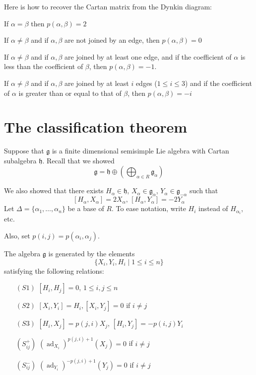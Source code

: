 \documentclass[x11names,reqno,14pt]{extarticle}
\newcommand{\mk}[1]{\mathfrak{#1}}
\newcommand{\g}{\mk{g}}
\newcommand{\h}{\mk{h}}
\DeclareMathOperator{\ad}{ad}
\begin{document}
Here is how to recover the Cartan matrix from the Dynkin diagram: 

If $\alpha = \beta$ then $p(\alpha,\beta)=2$

If $\alpha\neq\beta$ and if $\alpha,\beta$ are not joined by an edge, then $p(\alpha,\beta)=0$

If $\alpha\neq\beta$ and if $\alpha,\beta$ are joined by at least one edge, and if the coefficient of $\alpha$ is less than the coefficient of $\beta$, then $p(\alpha,\beta)=-1$.

If $\alpha\neq\beta$ and if $\alpha,\beta$ are joined by at least $i$ edges ($1\leq i\leq3$) and if the coefficient of $\alpha$ is greater than or equal to that of $\beta$, then $p(\alpha,\beta)=-i$

\section*{The classification theorem}

Suppose that $\g$ is a finite dimensional semisimple Lie algebra with Cartan subalgebra $\h$. Recall that we showed 
\[
\g = \h\oplus\left(\bigoplus_{\alpha\in R}\g_\alpha\right)
\]

We also showed that there exists $H_\alpha\in\h$, $X_\alpha\in\g_\alpha$, $Y_\alpha\in\g_{-\alpha}$ such that
\[
[H_\alpha,X_\alpha] = 2X_\alpha,\, [H_\alpha,Y_\alpha] = -2Y_\alpha
\]
Let $\Delta = \{\alpha_1,\dots,\alpha_n\}$ be a base of $R$. To ease notation, write $H_i$ instead of $H_{\alpha_i}$, etc. 

Also, set $p(i,j) = p(\alpha_i,\alpha_j)$. 

\thm

The algebra $\g$ is generated by the elements 
\[
\{X_i, Y_i, H_i \mid 1\leq i \leq n\}
\]
satisfying the following relations:
\begin{itemize}

\item[$(S1)$] $[H_i,H_j] = 0$, $1\leq i, j \leq n$

\item[$(S2)$] $[X_i,Y_i] = H_i, [X_i,Y_j] = 0$ if $i\neq j$

\item[$(S3)$] $[H_i,X_j] = p(j,i)X_j$, $[H_i,Y_j] = -p(i,j)Y_i$

\item[$(S_{ij}^+)$] $(\ad_{X_i})^{p(j,i) + 1}(X_j) = 0$ if $i \neq j$

\item[$(S_{ij}^-)$] $(\ad_{Y_i})^{-p(j,i) + 1}(Y_j) = 0$ if $i \neq j$

\end{itemize}
\end{document}
